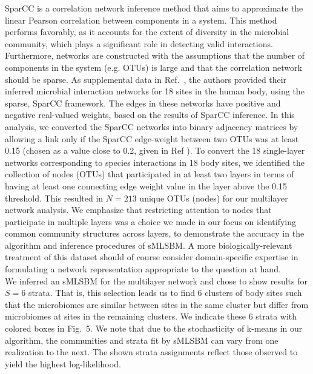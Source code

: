 {\indent SparCC is a correlation network inference method that aims to approximate the linear Pearson correlation between components in a system. This method performs favorably, as it accounts for the extent of diversity in the microbial community, which plays a significant role in detecting valid interactions. Furthermore, networks are constructed with the assumptions that the number of components in the system (e.g. OTUs) is large and that the correlation network should be sparse.  As supplemental data in Ref.~\cite{sparcc}, the authors provided their inferred microbial interaction networks for 18 sites in the human body, using the sparse, SparCC framework. The edges in these networks have positive and negative real-valued weights, based on the results of SparCC inference. In this analysis, we converted the SparCC networks into binary adjacency matrices by allowing a link only if the SparCC edge-weight between two OTUs was at least 0.15 (chosen as a value close to 0.2, given in Ref \cite{sparcc}). To convert the 18 single-layer networks corresponding to species interactions in 18 body sites, we identified the collection of nodes (OTUs) that participated in at least two layers in terms of having at least one connecting edge weight value in the layer above the 0.15 threshold}. This resulted in $N=213$ unique OTUs (nodes) for our multilayer network analysis. We emphasize that restricting attention to nodes that participate in multiple layers was a choice we made in our focus on identifying common community structures across layers, to demonstrate the accuracy in the algorithm and inference procedures of sMLSBM. A more biologically-relevant treatment of this dataset should of course consider domain-specific expertise in formulating a network representation appropriate to the question at hand.\\
\indent We inferred an sMLSBM for the multilayer network and chose to show results for $S=6$ strata. That is, this selection leads us to find 6 clusters of body sites such that the microbiomes are similar between sites in the same cluster but differ from microbiomes at sites in the remaining clusters.
 We indicate these 6 strata with colored boxes in  Fig.~5. We note that due to the stochasticity of k-means in our algorithm, the communities and strata fit by sMLSBM can vary from one realization to the next. The shown strata assignments reflect those observed to yield the highest log-likelihood.

